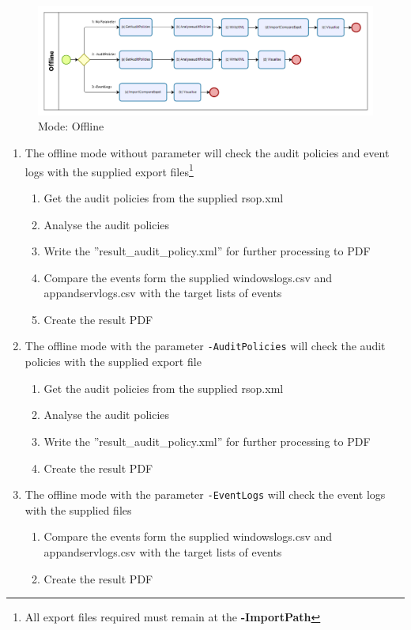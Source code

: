 \begin{figure}[H]
    \centering
    \includegraphics[width=1\linewidth]{assets/modes/offline.png}
    \caption{Mode: Offline}
\end{figure}
\begin{enumerate}
    \item The offline mode without parameter will check the audit policies and event logs with the supplied export files\footnote{All export files required must remain at the \textbf{-ImportPath}}
    \begin{enumerate}
        \item Get the audit policies from the supplied rsop.xml
        \item Analyse the audit policies
        \item Write the ''result\_audit\_policy.xml'' for further processing to PDF
        \item Compare the events form the supplied windowslogs.csv and appandservlogs.csv with the target lists of events
        \item Create the result PDF
    \end{enumerate}
    \item The offline mode with the parameter \lstinline|-AuditPolicies| will check the audit policies with the supplied export file
    \begin{enumerate}
        \item Get the audit policies from the supplied rsop.xml
        \item Analyse the audit policies
        \item Write the ''result\_audit\_policy.xml'' for further processing to PDF
        \item Create the result PDF
    \end{enumerate}
    \item The offline mode with the parameter \lstinline|-EventLogs| will check the event logs with the supplied files
    \begin{enumerate}
        \item Compare the events form the supplied windowslogs.csv and appandservlogs.csv with the target lists of events
        \item Create the result PDF
    \end{enumerate}
\end{enumerate}

